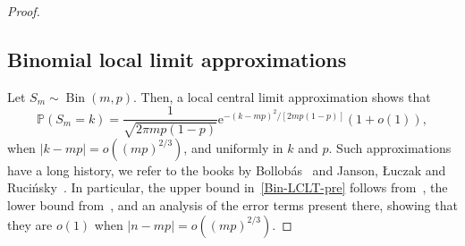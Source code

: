 \documentclass[ twocolumn,
 amsmath,amssymb,
 aps, pre, amsthm, amsfonts,
]{revtex4-2}
\newcommand{\prob}{\mathbb{P}}
\begin{document}
\begin{proof}
\subsection{Binomial local limit approximations}
Let $S_m\sim \operatorname{Bin}(m,p)$. Then, a local central limit approximation shows that
\begin{equation}
    \label{Bin-LCLT-pre}
    \prob(S_m=k)=\frac{1}{\sqrt{2 \pi mp(1-p)}}{\mathrm{e}}^{-(k-mp)^2/[2mp(1-p)]}(1+o(1)),
\end{equation}
when $|k-mp|=o((mp)^{2/3})$, and uniformly in $k$ and $p$. Such approximations have a long history, we refer to the books by Bollob\'as~\cite{bollobas2001cambridge} and Janson, {\L}uczak and Ruci\'nsky~\cite{janson2000wiley}. In particular, the upper bound in~\eqref{Bin-LCLT-pre} follows from~\cite[Theorem 1.2]{bollobas2001cambridge}, the lower bound from~\cite[Theorem 1.5]{bollobas2001cambridge}, and an analysis of the error terms present there, showing that they are $o(1)$ when $|n-mp|=o((mp)^{2/3})$.


\end{proof}
\end{document}
